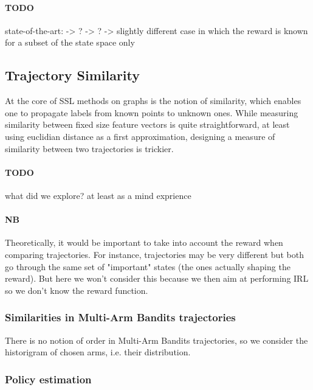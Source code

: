 \documentclass{article}
\begin{document}
\paragraph{TODO} state-of-the-art:
\cite{Valko12} -> ?
\cite{Audiffren15} -> ?
\cite{Finn17} -> slightly different case in which the reward is known for a subset of the state space only

\subsection{Trajectory Similarity}

At the core of SSL methods on graphs is the notion of similarity, which enables one to propagate labels from known points to unknown ones. While measuring similarity between fixed size feature vectors is quite straightforward, at least using euclidian distance as a first approximation, designing a measure of similarity between two trajectories is trickier.

\paragraph{TODO}
what did we explore? at least as a mind exprience

\paragraph{NB} Theoretically, it would be important to take into account the reward when comparing trajectories. For instance, trajectories may be very different but both go through the same set of "important" states (the ones actually shaping the reward). But here we won't consider this because we then aim at performing IRL so we don't know the reward function.

\subsubsection{Similarities in Multi-Arm Bandits trajectories}

There is no notion of order in Multi-Arm Bandits trajectories, so we consider the historigram of chosen arms, i.e. their distribution.

\subsubsection{Policy estimation}
\end{document}
